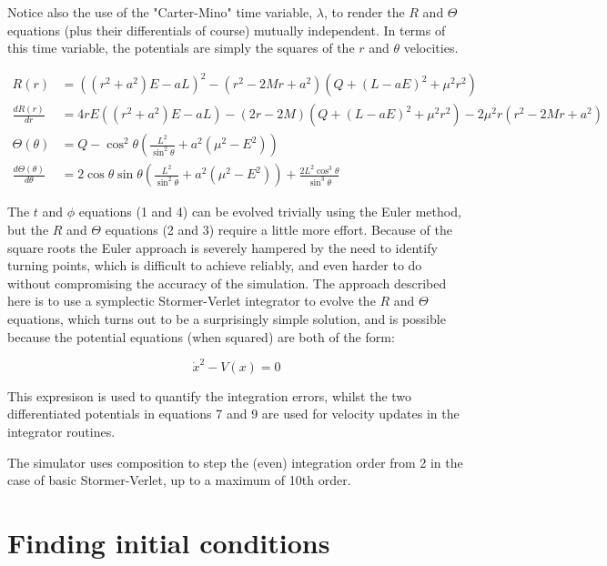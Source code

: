 \documentclass[11pt]{article}
\begin{document}
Notice also the use of the "Carter-Mino" time variable, $\lambda$, to render the $R$ and $\Theta$ equations (plus their differentials of course) mutually independent.  In terms of this time variable, the potentials are simply the squares of the $r$ and $\theta$ velocities.

\begin{align}
R(r) &= \left((r^2 + a^2) E - aL \right)^2 - (r^2 - 2Mr  + a^2) \left(Q + ( L - aE)^2 + \mu^2 r^2 \right) \\
\frac{d R(r)}{d r} &= 4rE \left((r^2 + a^2)E - aL \right) - (2r - 2M) \left(Q + ( L - aE)^2 + \mu^2 r^2 \right) - 2\mu^2r(r^2 - 2Mr  + a^2) \\
\Theta (\theta) &= Q - {\cos^2 \theta } \left( \frac{L^2}{\sin^2 \theta } + a^2( \mu^2 - E^2) \right) \\
\frac{d \Theta (\theta)}{d \theta} &= 2 \cos \theta \sin \theta \left(\frac{L^2} {\sin^2 \theta } + a^2(\mu^2 - E^2) \right) +\frac{2 L^2 \cos^3 \theta } {\sin^3 \theta }
\end{align}

The $t$ and $\phi$ equations (1 and 4) can be evolved trivially using the Euler method, but the $R$ and $\Theta$ equations (2 and 3) require a little more effort.  Because of the square roots the Euler approach is severely hampered by the need to identify turning points, which is difficult to achieve reliably, and even harder to do without compromising the accuracy of the simulation.  The approach described here is to use a symplectic Stormer-Verlet integrator \cite{hairer} to evolve the $R$ and $\Theta$ equations, which turns out to be a surprisingly simple solution, and is possible because the potential equations (when squared) are both of the form:

\begin{equation}
\dot x^2 - V(x) = 0
\end{equation}

This expresison is used to quantify the integration errors, whilst the two differentiated potentials in equations 7 and 9 are used for velocity updates in the integrator routines.

The simulator uses composition \cite{hairer} to step the (even) integration order from 2 in the case of basic Stormer-Verlet, up to a maximum of 10th order.

\section{Finding initial conditions}
\end{document}
